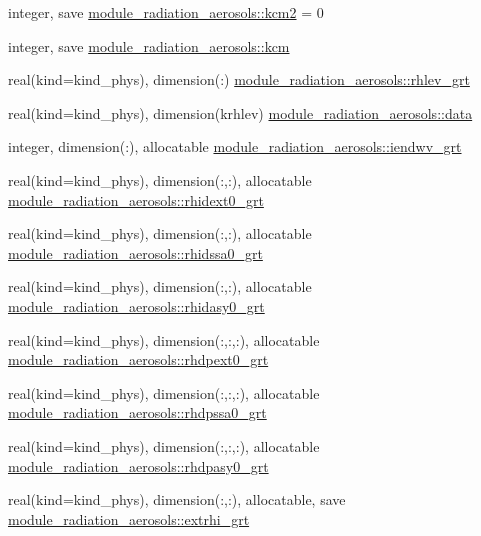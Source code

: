 \begin{DoxyCompactItemize}
\item 
integer, save \hyperlink{group__module__radiation__aerosols_gab2be28697a95bcec8d5cd8de7ebd4328}{module\+\_\+radiation\+\_\+aerosols\+::kcm2} = 0
\item 
integer, save \hyperlink{group__module__radiation__aerosols_ga4816bc93b826ff2fad9ff0805ea39fd5}{module\+\_\+radiation\+\_\+aerosols\+::kcm}
\item 
real(kind=kind\+\_\+phys), dimension(\+:) \hyperlink{group__module__radiation__aerosols_gace40d50e36de1fc08c4ff35f6d8dbda9}{module\+\_\+radiation\+\_\+aerosols\+::rhlev\+\_\+grt}
\item 
real(kind=kind\+\_\+phys), dimension(krhlev) \hyperlink{group__module__radiation__aerosols_ga1248e740e53498ed7a06f7d475b1fb25}{module\+\_\+radiation\+\_\+aerosols\+::data}
\item 
integer, dimension(\+:), allocatable \hyperlink{group__module__radiation__aerosols_gac755c4235327053fff060ffa3b2ee2a3}{module\+\_\+radiation\+\_\+aerosols\+::iendwv\+\_\+grt}
\item 
real(kind=kind\+\_\+phys), dimension(\+:,\+:), allocatable \hyperlink{group__module__radiation__aerosols_ga6683021bded82850053c16eb3e906998}{module\+\_\+radiation\+\_\+aerosols\+::rhidext0\+\_\+grt}
\item 
real(kind=kind\+\_\+phys), dimension(\+:,\+:), allocatable \hyperlink{group__module__radiation__aerosols_gaea46db63db26a316e73640bc63f75383}{module\+\_\+radiation\+\_\+aerosols\+::rhidssa0\+\_\+grt}
\item 
real(kind=kind\+\_\+phys), dimension(\+:,\+:), allocatable \hyperlink{group__module__radiation__aerosols_ga8491a714c86e9bd7ebdc401662f5068e}{module\+\_\+radiation\+\_\+aerosols\+::rhidasy0\+\_\+grt}
\item 
real(kind=kind\+\_\+phys), dimension(\+:,\+:,\+:), allocatable \hyperlink{group__module__radiation__aerosols_ga35a5c7b67a3cf11c5016a693e115d384}{module\+\_\+radiation\+\_\+aerosols\+::rhdpext0\+\_\+grt}
\item 
real(kind=kind\+\_\+phys), dimension(\+:,\+:,\+:), allocatable \hyperlink{group__module__radiation__aerosols_ga40d680662eadf30221997dadcce734b1}{module\+\_\+radiation\+\_\+aerosols\+::rhdpssa0\+\_\+grt}
\item 
real(kind=kind\+\_\+phys), dimension(\+:,\+:,\+:), allocatable \hyperlink{group__module__radiation__aerosols_gab5a0bbefbfed6b393f0abad26e6e4d04}{module\+\_\+radiation\+\_\+aerosols\+::rhdpasy0\+\_\+grt}
\item 
real(kind=kind\+\_\+phys), dimension(\+:,\+:), allocatable, save \hyperlink{group__module__radiation__aerosols_gacb7ff037be78e950ea42d956816c93d5}{module\+\_\+radiation\+\_\+aerosols\+::extrhi\+\_\+grt}

\end{DoxyCompactItemize}
